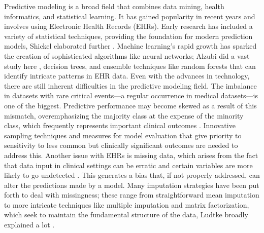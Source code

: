 \documentclass[manuscript,screen,]{acmart}
\begin{document}
Predictive modeling is a broad field that combines data mining, health informatics, and statistical learning. It has gained popularity in recent years and involves using Electronic Health Records (EHRs). Early research has included a variety of statistical techniques, providing the foundation for modern prediction models, Shickel elaborated further \cite{shickel2017deep}. Machine learning's rapid growth has sparked the creation of sophisticated algorithms like neural networks; Alzubi did a vast study here \cite{Alzubi2018ML}, decision trees, and ensemble techniques like random forests that can identify intricate patterns in EHR data.
Even with the advances in technology, there are still inherent difficulties in the predictive modeling field. The imbalance in datasets with rare critical events—a regular occurrence in medical datasets—is one of the biggest. Predictive performance may become skewed as a result of this mismatch, overemphasizing the majority class at the expense of the minority class, which frequently represents important clinical outcomes \cite{unique_key}. Innovative sampling techniques and measures for model evaluation that give priority to sensitivity to less common but clinically significant outcomes are needed to address this.
Another issue with EHRs is missing data, which arises from the fact that data input in clinical settings can be erratic and certain variables are more likely to go undetected \cite{Getzen2023Mining}. This generates a bias that, if not properly addressed, can alter the predictions made by a model. Many imputation strategies have been put forth to deal with missingness; these range from straightforward mean imputation to more intricate techniques like multiple imputation and matrix factorization, which seek to maintain the fundamental structure of the data, Ludtke broadly explained a lot \cite{Ludtke2017MultipleImputation}.
\end{document}
